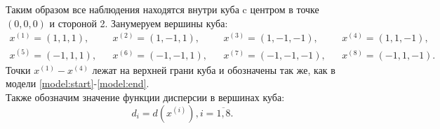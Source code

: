 	Таким образом все наблюдения находятся внутри куба c центром в точке $(0, 0, 0)$ и стороной 2.
	Занумеруем вершины куба:
	\begin{align*}
		x^{(1)} = (1, 1, 1), && x^{(2)} = (1, -1, 1), && x^{(3)} = (1, -1, -1), && x^{(4)} = (1, 1, -1),\\
		x^{(5)} = (-1, 1, 1), && x^{(6)} = (-1, -1, 1), && x^{(7)} = (-1, -1, -1), && x^{(8)} = (-1, 1, -1).
	\end{align*}
	Точки $x^{(1)}-x^{(4)}$ лежат на верхней грани куба и обозначены так же, как в модели \eqref{model:start}-\eqref{model:end}.\\
	Также обозначим значение функции дисперсии в вершинах куба:
	\begin{equation}
		d_i = d(x^{(i)}), i = \overline{1, 8}.
	\end{equation}
	
